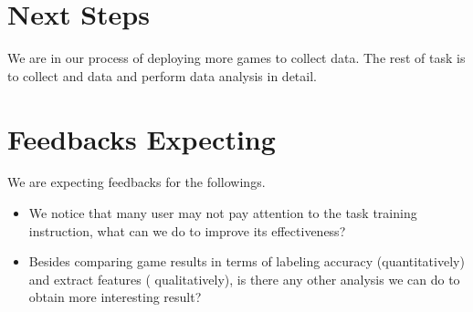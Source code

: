 \documentclass{article}
\begin{document}
\section{Next Steps}

We are in our process of deploying more games to collect data. The rest of task is to collect and data and perform data analysis in detail.

\section{Feedbacks Expecting}

We are expecting feedbacks for the followings.
\begin{itemize}
\item We notice that many user may not pay attention to the task training instruction, what can we do to improve its effectiveness?
\item Besides comparing game results in terms of labeling accuracy (quantitatively) and extract features ( qualitatively), is there any other analysis we can do to obtain more interesting result?
\end{itemize}
\end{document}
